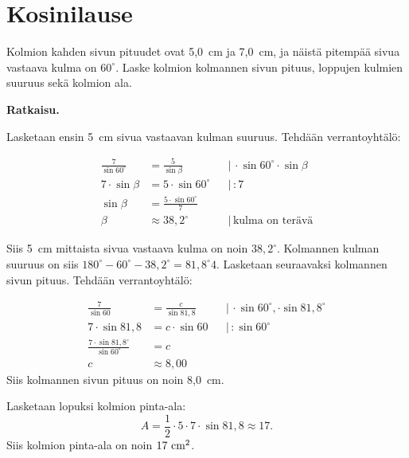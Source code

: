 \section{Kosinilause}

\begin{esimerkki}
Kolmion kahden sivun pituudet ovat 5,0~cm ja 7,0~cm, ja näistä pitempää sivua vastaava kulma on $60^\circ$. Laske kolmion kolmannen sivun pituus, loppujen kulmien suuruus sekä kolmion ala.



\textbf{Ratkaisu.}

Lasketaan ensin 5~cm sivua vastaavan kulman suuruus. Tehdään verrantoyhtälö:

\begin{align*}
\frac{7}{\sin 60^\circ}  &= \frac{5}{\sin \beta} & & | \, \cdot \sin 60^\circ \cdot \sin \beta\\
7 \cdot \sin \beta &= 5 \cdot \sin 60^\circ  & & | \,  :7\\
\sin \beta         &= \frac{5 \cdot \sin 60^\circ}{7}\\
\beta              &\approx 38,2^\circ & & | \, \text{kulma on terävä}
\end{align*}

Siis 5~cm mittaista sivua vastaava kulma on noin $38,2^\circ$. Kolmannen kulman suuruus on siis $180^\circ - 60^\circ -38,2^\circ = 81,8^\circ4$.
Lasketaan seuraavaksi kolmannen sivun pituus. Tehdään verrantoyhtälö:

\begin{align*}
\frac{7}{\sin 60}                 &= \frac{c}{\sin 81,8} & & | \,  \cdot \sin 60^\circ, \cdot \sin 81,8^\circ \\
7 \cdot \sin 81,8                 &= c \cdot \sin 60     & & | \,  : \sin 60^\circ \\
\frac{7 \cdot \sin 81,8^\circ}{\sin 60^\circ} &= c \\
c                                 &\approx 8,00
\end{align*}
Siis kolmannen sivun pituus on noin 8,0~cm.


Lasketaan lopuksi kolmion pinta-ala:
$$A = \frac{1}{2} \cdot 5 \cdot 7 \cdot \sin 81,8 \approx 17.$$
Siis kolmion pinta-ala on noin $17~\textnormal{cm}^2$.
\end{esimerkki}


